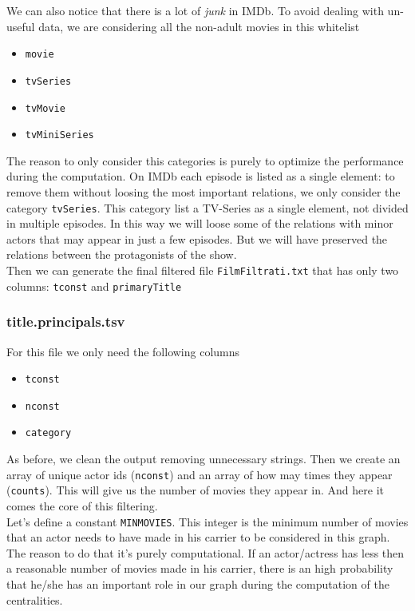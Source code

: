 \noindent We can also notice that there is a lot of \emph{junk} in IMDb. To avoid dealing with un-useful data, we are considering all the non-adult movies in this whitelist

\begin{itemize}
    \item \texttt{movie}
    \item \texttt{tvSeries}
    \item \texttt{tvMovie}
    \item \texttt{tvMiniSeries}
\end{itemize}
The reason to only consider this categories is purely to optimize the performance during the computation. On IMDb each episode is listed as a single element: to remove them without loosing the most important relations, we only consider the category \texttt{tvSeries}. This category list a TV-Series as a single element, not divided in multiple episodes. In this way we will loose some of the relations with minor actors that may appear in just a few episodes. But we will have preserved the relations between the protagonists of the show. \\

\noindent Then we can generate the final filtered file \texttt{FilmFiltrati.txt} that has only two columns: \texttt{tconst} and \texttt{primaryTitle}

\subsubsection{title.principals.tsv}

For this file we only need the following columns

\begin{itemize}
    \item \texttt{tconst}
    \item \texttt{nconst}
    \item \texttt{category}
\end{itemize}
As before, we clean the output removing unnecessary strings. Then we create an array of unique actor ids (\texttt{nconst}) and an array of how may times they appear (\texttt{counts}). This will give us the number of movies they appear in. And here it comes the core of this filtering. \\

\noindent Let's define a constant \texttt{{MINMOVIES}}. This integer is the minimum number of movies that an actor needs to have made in his carrier to be considered in this graph. The reason to do that it's purely computational. If an actor/actress has less then a reasonable number of movies made in his carrier, there is an high probability that he/she has an important role in our graph during the computation of the centralities.

